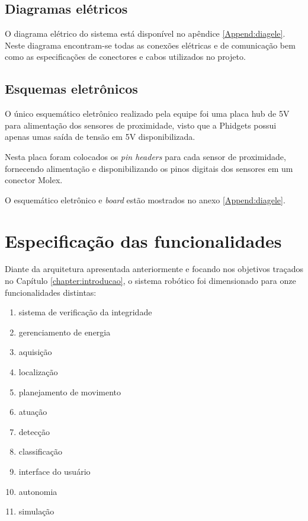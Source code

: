 \subsection{Diagramas elétricos}
\label{sec:diage}
O diagrama elétrico do sistema está disponível no apêndice \ref{Append:diagele}. Neste diagrama encontram-se todas as conexões elétricas e de comunicação bem como as especificações de conectores e cabos utilizados no projeto.


\subsection{Esquemas eletrônicos}
\label{ssec:esqe}
O único esquemático eletrônico realizado pela equipe foi uma placa hub de 5V para alimentação dos sensores de proximidade, visto que a Phidgets possui apenas umas saída de tensão em 5V disponibilizada.

 Nesta placa foram colocados os \textit{pin headers} para cada sensor de proximidade, fornecendo alimentação e disponibilizando os pinos digitais dos sensores em um conector Molex.

O esquemático eletrônico e \textit{board} estão mostrados no anexo \ref{Append:diagele}.


\section{Especificação das funcionalidades}
\label{sec:espf}
Diante da arquitetura apresentada anteriormente e focando nos objetivos traçados no Capítulo \ref{chapter:introducao}, o sistema robótico foi dimensionado para onze funcionalidades distintas:

\begin{enumerate}%
	\item sistema de verificação da integridade
	\item gerenciamento de energia
	\item aquisição
	\item localização
	\item planejamento de movimento
	\item atuação
	\item detecção
	\item classificação
	\item interface do usuário
	\item autonomia
	\item simulação
\end{enumerate}

